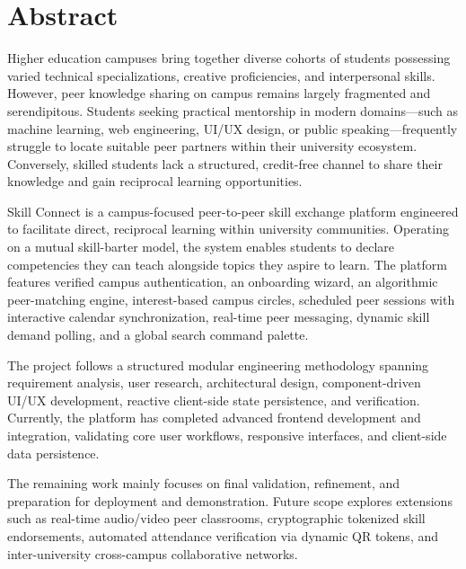 \documentclass[12pt,a4paper]{report}
\begin{document}
\newpage
{}
\setcounter{page}{1}

\section*{Abstract}

Higher education campuses bring together diverse cohorts of students possessing varied technical specializations, creative proficiencies, and interpersonal skills. However, peer knowledge sharing on campus remains largely fragmented and serendipitous. Students seeking practical mentorship in modern domains---such as machine learning, web engineering, UI/UX design, or public speaking---frequently struggle to locate suitable peer partners within their university ecosystem. Conversely, skilled students lack a structured, credit-free channel to share their knowledge and gain reciprocal learning opportunities.

Skill Connect is a campus-focused peer-to-peer skill exchange platform engineered to facilitate direct, reciprocal learning within university communities. Operating on a mutual skill-barter model, the system enables students to declare competencies they can teach alongside topics they aspire to learn. The platform features verified campus authentication, an onboarding wizard, an algorithmic peer-matching engine, interest-based campus circles, scheduled peer sessions with interactive calendar synchronization, real-time peer messaging, dynamic skill demand polling, and a global search command palette.

The project follows a structured modular engineering methodology spanning requirement analysis, user research, architectural design, component-driven UI/UX development, reactive client-side state persistence, and verification. Currently, the platform has completed advanced frontend development and integration, validating core user workflows, responsive interfaces, and client-side data persistence.

The remaining work mainly focuses on final validation, refinement, and preparation for deployment and demonstration. Future scope explores extensions such as real-time audio/video peer classrooms, cryptographic tokenized skill endorsements, automated attendance verification via dynamic QR tokens, and inter-university cross-campus collaborative networks.
\end{document}
